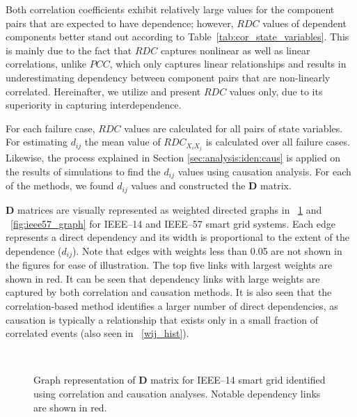 \documentclass[12pt]{elsarticle}
\begin{document}
Both correlation coefficients exhibit relatively large values for the component pairs that are expected to have dependence; however, $RDC$ values of dependent components better stand out according to Table~\ref{tab:cor_state_variables}. This is mainly due to the fact that $RDC$ captures nonlinear as well as linear correlations, unlike $PCC$, which only captures linear relationships and results in underestimating dependency between component pairs that are non-linearly correlated. Hereinafter, we utilize and present $RDC$ values only, due to its superiority in capturing interdependence.

For each failure case, $RDC$ values are calculated for all pairs of state variables. For estimating $d_{ij}$ the mean value of $RDC_{X_i X_j}$ is calculated over all failure cases. Likewise, the process explained in Section \ref{sec:analysis:iden:caus} is applied on the results of simulations to find the $d_{ij}$ values using causation analysis. For each of the methods, we found $d_{ij}$ values and constructed the $\mathbf{D}$ matrix.

$\mathbf{D}$ matrices are visually represented as weighted directed graphs in \figurename~\ref{fig:ieee14_graph} and \figurename~\ref{fig:ieee57_graph} for IEEE--14 and IEEE--57 smart grid systems. Each edge represents a direct dependency and its width is proportional to the extent of the dependence ($d_{ij}$). Note that edges with weights less than 0.05 are not shown in the figures for ease of illustration. The top five links with largest weights are shown in red. It can be seen that dependency links with large weights are captured by both correlation and causation methods. It is also seen that the correlation-based method identifies a larger number of direct dependencies, as causation is typically a relationship that exists only in a small fraction of correlated events (also seen in \figurename~\ref{wij_hist}).

\begin{figure}[H]
\centering
{}
~
\caption{Graph representation of $\mathbf{D}$ matrix for IEEE--14 smart grid identified using correlation \protect{} and causation \protect{} analyses. Notable dependency links are shown in red.}
\label{fig:ieee14_graph}
\end{figure}
\end{document}
